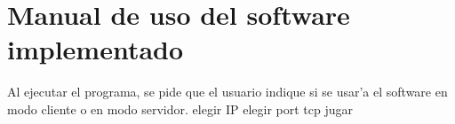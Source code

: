 \section{Manual de uso del software implementado}
Al ejecutar el programa, se pide que el usuario indique si se usar'a el software en modo cliente o en modo servidor.
elegir IP
elegir port tcp
jugar